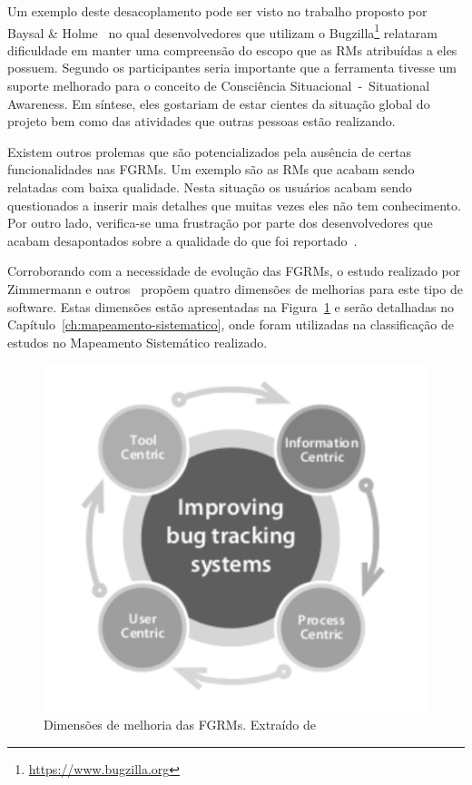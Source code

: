 Um exemplo deste desacoplamento pode ser visto no trabalho proposto por Baysal
\& Holme~\cite{baysal2012qualitative} no qual desenvolvedores que utilizam o
Bugzilla\footnote{\url{https://www.bugzilla.org}} relataram dificuldade em
manter uma compreensão do escopo que as RMs atribuídas a eles possuem. Segundo
os participantes seria importante que a ferramenta tivesse um suporte melhorado
para o conceito de Consciência Situacional~-~Situational Awareness. Em síntese,
eles gostariam de estar cientes da situação global do projeto bem como das
atividades que outras pessoas estão realizando.

Existem outros prolemas que são potencializados pela ausência de certas
funcionalidades nas FGRMs. Um exemplo são as RMs que acabam sendo relatadas com
baixa qualidade. Nesta situação os usuários acabam sendo questionados a inserir
mais detalhes que muitas vezes eles não tem conhecimento. Por outro lado,
verifica-se uma frustração por parte dos desenvolvedores que acabam desapontados
sobre a qualidade do que foi reportado~\cite{just2008towards}.

Corroborando com a necessidade de evolução das FGRMs, o estudo realizado por
Zimmermann e outros~\cite{zimmermann2009improving} propõem quatro dimensões de
melhorias para este tipo de software. Estas dimensões estão apresentadas na
Figura~\ref{fig:dimensoes_melhorias_fgrm} e serão detalhadas no
Capítulo~\ref{ch:mapeamento-sistematico}, onde foram utilizadas na classificação
de estudos no Mapeamento Sistemático realizado.


\begin{figure}[htpb] \centering
	\includegraphics[width=0.6\linewidth]
	{chapter-intro/img/dimensoes_melhorias_fgrm.pdf}
	\caption{Dimensões de melhoria das FGRMs. Extraído de~\cite{zimmermann2005mining}}
\label{fig:dimensoes_melhorias_fgrm}
\end{figure}

